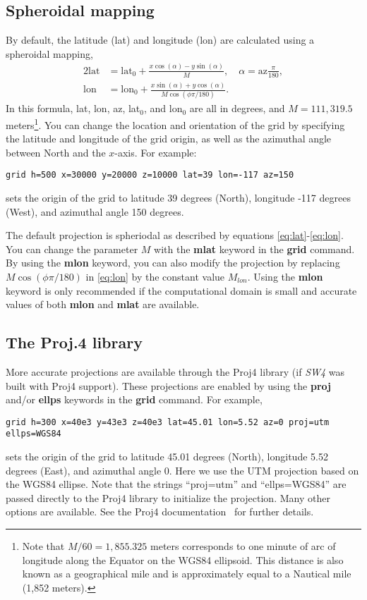 \documentclass[11pt]{report}
\begin{document}
\subsection{Spheroidal mapping}
By default, the latitude (lat) and longitude (lon) are calculated using a spheroidal mapping,
\begin{alignat}{2}
\mbox{lat} &= \mbox{lat$_0$} + \frac{x\cos(\alpha) - y\sin(\alpha)}{M},\quad \alpha =
\mbox{az}\frac{\pi}{180}, \label{eq:lat}\\
\mbox{lon} &= \mbox{lon$_0$} + \frac{x\sin(\alpha ) + y\cos(\alpha)}{M\cos(\phi \pi/180)}.\label{eq:lon}
\end{alignat}
In this formula, lat, lon, az, lat$_0$, and lon$_0$ are all in degrees, and $M = 111,319.5$
meters\footnote{Note that $M/60 = 1,855.325$ meters corresponds to one minute of arc of
  longitude along the Equator on the WGS84 ellipsoid. This distance is also known as a geographical
  mile and is approximately equal to a Nautical mile (1,852 meters).}.  You can change the location
and orientation of the grid by specifying the latitude and longitude of the grid origin, as well as
the azimuthal angle between North and the $x$-axis. For example:
\begin{verbatim}
grid h=500 x=30000 y=20000 z=10000 lat=39 lon=-117 az=150
\end{verbatim}
sets the origin of the grid to latitude 39 degrees (North), longitude -117 degrees
(West), and azimuthal angle 150 degrees.

The default projection is spheriodal as described by equations \eqref{eq:lat}-\eqref{eq:lon}. You
can change the parameter $M$ with the {\bf mlat} keyword in the {\bf grid} command. By using the
{\bf mlon} keyword, you can also modify the projection by replacing $M\cos(\phi\pi/180)$ in
\eqref{eq:lon} by the constant value $M_{lon}$. Using the {\bf mlon} keyword is only recommended if
the computational domain is small and accurate values of both {\bf mlon} and {\bf mlat} are
available.

\subsection{The Proj.4 library}
More accurate projections are available through the Proj4 library (if
\emph{SW4} was built with Proj4 support). These projections are enabled by using the {\bf proj}
and/or {\bf ellps} keywords in the {\bf grid} command. For example,
\begin{verbatim}
grid h=300 x=40e3 y=43e3 z=40e3 lat=45.01 lon=5.52 az=0 proj=utm ellps=WGS84
\end{verbatim}
sets the origin of the grid to latitude 45.01 degrees (North), longitude 5.52 degrees (East), and
azimuthal angle 0. Here we use the UTM projection based on the WGS84 ellipse. Note that the strings
``proj=utm'' and ``ellps=WGS84'' are passed directly to the Proj4 library to initialize the
projection. Many other options are available. See the Proj4 documentation~\cite{Proj4} for further
details.
\end{document}
